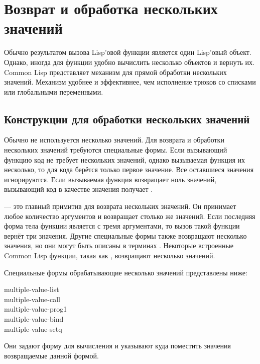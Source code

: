 \section{Возврат и обработка нескольких значений}

Обычно результатом вызова Lisp'овой функции является один Lisp'овый объект.
Однако, иногда для функции удобно вычислить несколько объектов и вернуть их.
Common Lisp представляет механизм для прямой обработки нескольких значений.
Механизм удобнее и эффективнее, чем исполнение трюков со списками или
глобальными переменными.

\subsection{Конструкции для обработки нескольких значений}

Обычно не используется несколько значений. Для возврата и обработки нескольких
значений требуются специальные формы.
Если вызывающий функцию код не требует нескольких значений, однако вызываемая
функция их несколько, то для кода берётся только первое значение. Все оставшиеся
значения игнорируются.
Если вызываемая функция возвращает ноль значений, вызывающий код в качестве
значения получает {\false}.

 --- это главный примитив для возврата нескольких значений. Он
принимает любое количество аргументов и возвращает столько же значений. Если
последняя форма тела функции является  с тремя аргументами, то вызов
такой функции вернёт три значения.
Другие специальные формы также возвращают несколько значения, но они могут быть
описаны в терминах . Некоторые встроенные Common Lisp функции, такая
как , возвращают несколько значений.

Специальные формы обрабатывающие несколько значений представлены ниже:
\begin{lisp}
multiple-value-list \\
multiple-value-call \\
multiple-value-prog1 \\
multiple-value-bind \\
multiple-value-setq
\end{lisp}
Они задают форму для вычисления и указывают куда поместить значения возвращаемые
данной формой.

